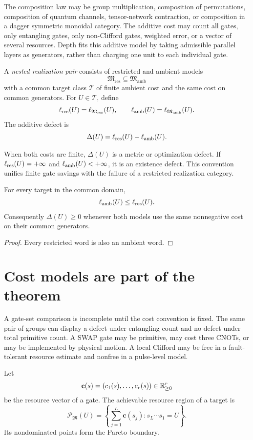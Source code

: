 The composition law may be group multiplication, composition of permutations, composition of quantum channels, tensor-network contraction, or composition in a dagger symmetric monoidal category.  The additive cost may count all gates, only entangling gates, only non-Clifford gates, weighted error, or a vector of several resources.  Depth fits this additive model by taking admissible parallel layers as generators, rather than charging one unit to each individual gate.

\begin{definition}
A \emph{nested realization pair} consists of restricted and ambient models
\[
\mathfrak M_{\mathrm{res}}\subseteq\mathfrak M_{\mathrm{amb}}
\]
with a common target class $\mathcal T$ of finite ambient cost and the same cost on common generators.  For $U\in\mathcal T$, define
\[
\ell_{\mathrm{res}}(U)=\ell_{\mathfrak M_{\mathrm{res}}}(U),
\qquad
\ell_{\mathrm{amb}}(U)=\ell_{\mathfrak M_{\mathrm{amb}}}(U).
\]
The additive defect is
\[
\Delta(U)=\ell_{\mathrm{res}}(U)-\ell_{\mathrm{amb}}(U).
\]
\end{definition}

When both costs are finite, $\Delta(U)$ is a metric or optimization defect.  If $\ell_{\mathrm{res}}(U)=+\infty$ and $\ell_{\mathrm{amb}}(U)<+\infty$, it is an existence defect.  This convention unifies finite gate savings with the failure of a restricted realization category.

\begin{proposition}[Monotonicity]
For every target in the common domain,
\[
\ell_{\mathrm{amb}}(U)\le \ell_{\mathrm{res}}(U).
\]
Consequently $\Delta(U)\ge0$ whenever both models use the same nonnegative cost on their common generators.
\end{proposition}
\begin{proof}
Every restricted word is also an ambient word.
\end{proof}

\section{Cost models are part of the theorem}
A gate-set comparison is incomplete until the cost convention is fixed.  The same pair of groups can display a defect under entangling count and no defect under total primitive count.  A SWAP gate may be primitive, may cost three CNOTs, or may be implemented by physical motion.  A local Clifford may be free in a fault-tolerant resource estimate and nonfree in a pulse-level model.

\begin{definition}
Let
\[
\mathbf c(s)=(c_1(s),\ldots,c_r(s))\in\mathbb R_{\ge0}^r
\]
be the resource vector of a gate.  The achievable resource region of a target is
\[
\mathcal P_{\mathfrak M}(U)
=
\left\{
\sum_{j=1}^L\mathbf c(s_j):s_L\cdots s_1=U
\right\}.
\]
Its nondominated points form the Pareto boundary.
\end{definition}

